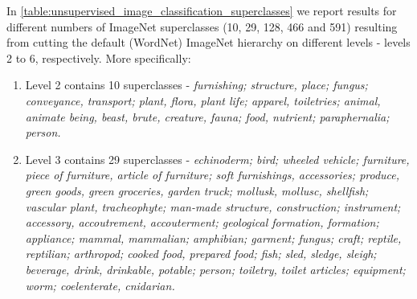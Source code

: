 \documentclass[runningheads]{llncs}
\begin{document}
In \cref{table:unsupervised_image_classification_superclasses} we report results for different numbers of ImageNet superclasses (10, 29, 128, 466 and 591) resulting from cutting the default (WordNet) ImageNet hierarchy on different levels - levels 2 to 6, respectively. More specifically:
\begin{enumerate}
    \item Level 2 contains 10 superclasses -  \textit{furnishing; structure, place; fungus; conveyance, transport; plant, flora, plant life; apparel, toiletries; animal, animate being, beast, brute, creature, fauna; food, nutrient; paraphernalia; person.}
    \item Level 3 contains 29 superclasses - \textit{echinoderm; bird; wheeled vehicle; furniture, piece of furniture, article of furniture; soft furnishings, accessories; produce, green goods, green groceries, garden truck; mollusk, mollusc, shellfish; vascular plant, tracheophyte; man-made structure, construction; instrument; accessory, accoutrement, accouterment; geological formation, formation; appliance; mammal, mammalian; amphibian; garment; fungus; craft; reptile, reptilian; arthropod; cooked food, prepared food; fish; sled, sledge, sleigh; beverage, drink, drinkable, potable; person; toiletry, toilet articles; equipment; worm; coelenterate, cnidarian.}

\end{enumerate}
\end{document}
